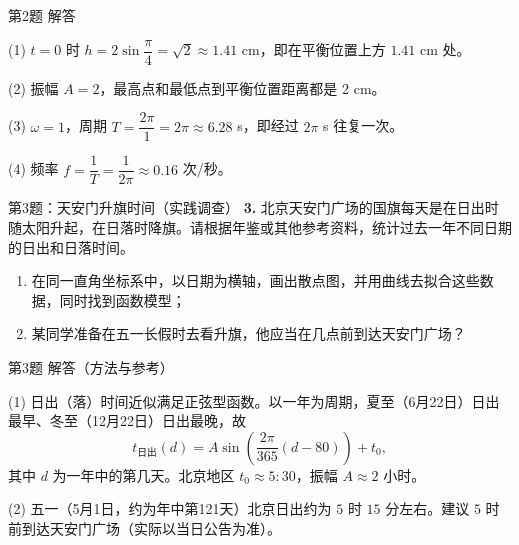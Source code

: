 \documentclass[10pt,aspectratio=169,serif]{beamer}
\begin{document}
\begin{frame}[t]{第2题 解答}
\begin{tcolorbox}[colback=orange!10,colframe=orange,title=\textbf{解}]
(1) $t=0$ 时 $h=2\sin\dfrac{\pi}{4}=\sqrt2\approx 1.41$ cm，即在平衡位置上方 $1.41$ cm 处。

(2) 振幅 $A=2$，最高点和最低点到平衡位置距离都是 $2$ cm。

(3) $\omega=1$，周期 $T=\dfrac{2\pi}{1}=2\pi\approx 6.28$ s，即经过 $2\pi$ s 往复一次。

(4) 频率 $f=\dfrac1T=\dfrac1{2\pi}\approx 0.16$ 次/秒。
\end{tcolorbox}
\begin{center}
\end{center}
\end{frame}

\begin{frame}[t]{第3题：天安门升旗时间（实践调查）}
\textbf{3.} 北京天安门广场的国旗每天是在日出时随太阳升起，在日落时降旗。请根据年鉴或其他参考资料，统计过去一年不同日期的日出和日落时间。
\begin{enumerate}
  \item 在同一直角坐标系中，以日期为横轴，画出散点图，并用曲线去拟合这些数据，同时找到函数模型；
  \item 某同学准备在五一长假时去看升旗，他应当在几点前到达天安门广场？
\end{enumerate}
\end{frame}

\begin{frame}[t]{第3题 解答（方法与参考）}
\begin{tcolorbox}[colback=orange!10,colframe=orange,title=\textbf{建模方法}]
(1) 日出（落）时间近似满足正弦型函数。以一年为周期，夏至（6月22日）日出最早、冬至（12月22日）日出最晚，故
\[
t_{\text{日出}}(d)=A\sin\!\left(\frac{2\pi}{365}(d-80)\right)+t_0,
\]
其中 $d$ 为一年中的第几天。北京地区 $t_0\approx 5:30$，振幅 $A\approx 2$ 小时。

(2) 五一（5月1日，约为年中第121天）北京日出约为 $5$ 时 $15$ 分左右。\alert{建议 $5$ 时前到达天安门广场}（实际以当日公告为准）。
\end{tcolorbox}
\end{frame}
\end{document}
